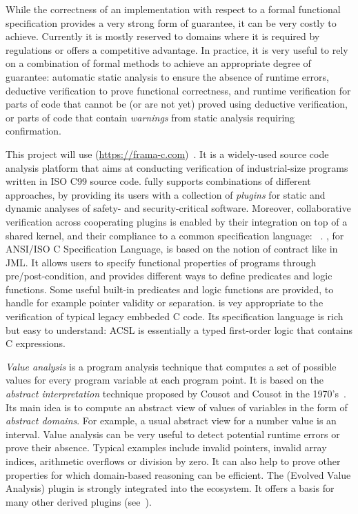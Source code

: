 While the correctness of an implementation with respect to a formal functional specification provides a very strong form of guarantee, it can be very costly to achieve.
Currently it is mostly reserved to domains where it is required by regulations or offers a competitive advantage.
In practice, it is very useful to rely on a combination of formal methods to achieve an appropriate degree of guarantee:
automatic static analysis to ensure the absence of runtime errors,
deductive verification to prove functional correctness,
and runtime verification for parts of code that cannot be (or are not yet) proved using deductive verification,
or parts of code that contain \emph{warnings} from static analysis requiring confirmation.

This project will use \framac{} (\url{https://frama-c.com})~\cite{KKP2015:FAC}.
It is a widely-used source code analysis platform that aims at conducting verification of industrial-size programs written in ISO C99 source code.
\framac{} fully supports combinations of different approaches, by providing its users with a collection of \emph{plugins} for static and dynamic analyses of safety- and security-critical software.
Moreover, collaborative verification across cooperating plugins is enabled by their integration on top of a shared kernel, and their compliance to a common specification language: \acsl~\cite{ACSL}.
\acsl, for ANSI/ISO C Specification Language, is based on the notion of contract like in JML.
It allows users to specify functional properties of programs through pre/post-condition, and provides different ways to define predicates and logic functions.
Some useful built-in predicates and logic functions are provided, to handle for example pointer validity or separation.
\framac is vey appropriate to the verification of typical legacy embbeded C code.
Its specification language is rich but easy to understand: ACSL is essentially a typed first-order logic that contains C expressions.

\emph{Value analysis} is a program analysis technique that computes a set of possible values for every program variable at each program point.
It is based on the \emph{abstract interpretation} technique proposed by Cousot and Cousot in the 1970's~\cite{cousot77}.
Its main idea is to compute an abstract view of values of variables in the form of \emph{abstract domains}.
For example, a usual abstract view for a number value is an interval.
Value analysis can be very useful to detect potential runtime errors or prove their absence.
Typical examples include invalid pointers, invalid array indices, arithmetic overflows or division by zero.
It can also help to prove other properties for which domain-based reasoning can be efficient.
The \Eva (Evolved Value Analysis) plugin is strongly integrated into the \framac ecosystem.
It offers a basis for many other derived plugins (see~\cite{KKP2015:FAC}).

